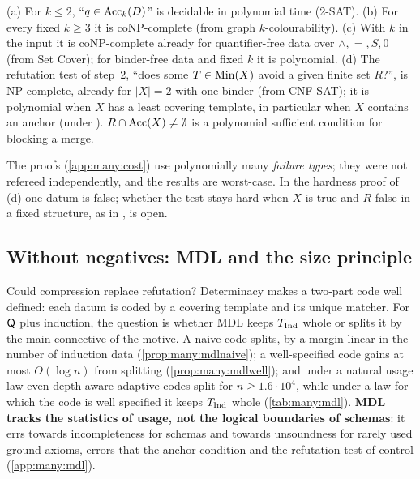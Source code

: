 \begin{theorem}[complexity]\label{thm:many:complexity}
(a) For $k\le2$, ``$q\in\mathrm{Acc}_k(D)$'' is decidable in polynomial time (2-SAT). (b) For every fixed $k\ge3$ it is
coNP-complete (from graph $k$-colourability). (c) With $k$ in the input it is coNP-complete already for quantifier-free
data over $\wedge,=,S,0$ (from Set Cover); for binder-free data and fixed $k$ it is polynomial. (d) The refutation test of
\DTRC{} step~2, ``does some $T\in\mathrm{Min}(X)$ avoid a given finite set $R$?'', is NP-complete, already for $|X|=2$ with one
binder (from CNF-SAT); it is polynomial when $X$ has a least covering template, in particular when $X$ contains an anchor
(under \Rich). $R\cap\mathrm{Acc}(X)\neq\emptyset$ is a polynomial sufficient condition for blocking a merge.
\end{theorem}
The proofs (\cref{app:many:cost}) use polynomially many \emph{failure types}; they were not refereed independently,
and the results are worst-case. In the hardness proof of (d) one datum is
false; whether the test stays hard when $X$ is true and $R$ false in a fixed structure, as in \DTRC, is open.

\subsection{Without negatives: MDL and the size principle}\label{sec:many:mdl}

Could compression replace refutation? Determinacy makes a two-part code well defined: each datum is coded by a covering
template and its unique matcher. For $\mathsf{Q}$ plus induction, the question is whether MDL keeps $T_{\mathrm{Ind}}$ whole or splits it
by the main connective of the motive. A naive code splits, by a margin linear in the number of induction data
(\cref{prop:many:mdlnaive}); a well-specified code gains at most $O(\log n)$ from splitting (\cref{prop:many:mdlwell});
and under a natural usage law even depth-aware adaptive codes split for $n\ge1.6\cdot10^4$, while under a law for which
the code is well specified it keeps $T_{\mathrm{Ind}}$ whole (\cref{tab:many:mdl}). \textbf{MDL tracks the statistics of usage,
not the logical boundaries of schemas}: it errs towards incompleteness for schemas and towards unsoundness for rarely used
ground axioms, errors that the anchor condition and the refutation test of \DTRC{} control (\cref{app:many:mdl}).

